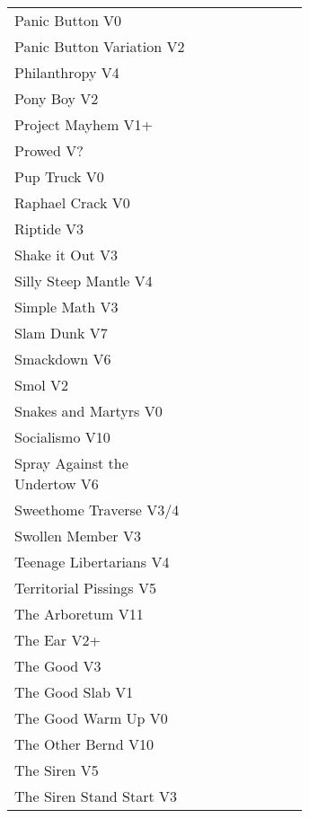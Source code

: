 \begin{flushleft}
\begin{center}
\begin{supertabular}{p{0.65\linewidth}r}
Panic Button V0 & \pageref{rt:Panic Button} \\
Panic Button Variation V2 & \pageref{vr:Panic Button Variation} \\
Philanthropy V4 & \pageref{rt:Philanthropy} \\
Pony Boy V2 & \pageref{rt:Pony Boy} \\
Project Mayhem V1+ & \pageref{rt:Project Mayhem} \\
Prowed V? & \pageref{vr:Prowed} \\
Pup Truck V0 & \pageref{rt:Pup Truck} \\
Raphael Crack V0 & \pageref{rt:Raphael Crack} \\
Riptide V3 & \pageref{rt:Riptide} \\
Shake it Out V3 & \pageref{vr:Shake it Out} \\
Silly Steep Mantle V4 & \pageref{rt:Silly Steep Mantle} \\
Simple Math V3 & \pageref{rt:Simple Math} \\
Slam Dunk V7 & \pageref{rt:Slam Dunk} \\
Smackdown V6 & \pageref{rt:Smackdown} \\
Smol V2 & \pageref{rt:Smol} \\
Snakes and Martyrs V0 & \pageref{rt:Snakes and Martyrs} \\
Socialismo V10 & \pageref{rt:Socialismo} \\
Spray Against the Undertow V6 & \pageref{vr:Spray Against the Undertow} \\
Sweethome Traverse V3/4 & \pageref{vr:Sweethome Traverse} \\
Swollen Member V3 & \pageref{rt:Swollen Member} \\
Teenage Libertarians V4 & \pageref{rt:Teenage Libertarians} \\
Territorial Pissings V5 & \pageref{rt:Territorial Pissings} \\
The Arboretum V11 & \pageref{rt:The Arboretum} \\
The Ear V2+ & \pageref{rt:The Ear} \\
The Good V3 & \pageref{rt:The Good} \\
The Good Slab V1 & \pageref{rt:The Good Slab} \\
The Good Warm Up V0 & \pageref{rt:The Good Warm Up} \\
The Other Bernd V10 & \pageref{rt:The Other Bernd} \\
The Siren V5 & \pageref{rt:The Siren} \\
The Siren Stand Start V3 & \pageref{vr:The Siren Stand Start} \\

\end{supertabular}
\end{center}
\end{flushleft}

